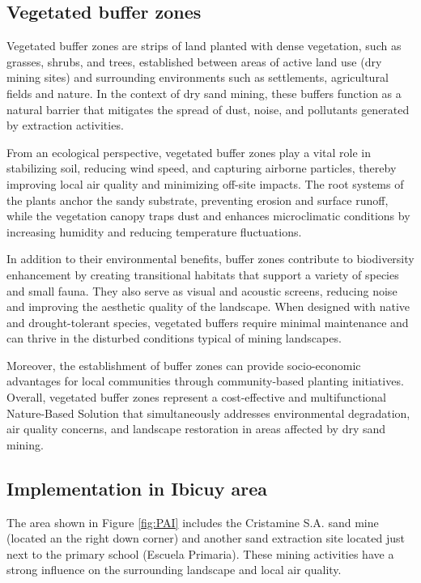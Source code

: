 \subsection{Vegetated buffer zones}
Vegetated buffer zones are strips of land planted with dense vegetation, such as grasses, shrubs, and trees, established between areas of active land use (dry mining sites) and surrounding environments such as settlements, agricultural fields and nature. In the context of dry sand mining, these buffers function as a natural barrier that mitigates the spread of dust, noise, and pollutants generated by extraction activities.

From an ecological perspective, vegetated buffer zones play a vital role in stabilizing soil, reducing wind speed, and capturing airborne particles, thereby improving local air quality and minimizing off-site impacts. The root systems of the plants anchor the sandy substrate, preventing erosion and surface runoff, while the vegetation canopy traps dust and enhances microclimatic conditions by increasing humidity and reducing temperature fluctuations.

In addition to their environmental benefits, buffer zones contribute to biodiversity enhancement by creating transitional habitats that support a variety of species and small fauna. They also serve as visual and acoustic screens, reducing noise and improving the aesthetic quality of the landscape. When designed with native and drought-tolerant species, vegetated buffers require minimal maintenance and can thrive in the disturbed conditions typical of mining landscapes.

Moreover, the establishment of buffer zones can provide socio-economic advantages for local communities through community-based planting initiatives. Overall, vegetated buffer zones represent a cost-effective and multifunctional Nature-Based Solution that simultaneously addresses environmental degradation, air quality concerns, and landscape restoration in areas affected by dry sand mining.

\subsection{Implementation in Ibicuy area}

The area shown in Figure \ref{fig:PAI} includes the Cristamine S.A. sand mine (located an the right down corner) and another sand extraction site located just next to the primary school (Escuela Primaria). These mining activities have a strong influence on the surrounding landscape and local air quality.

